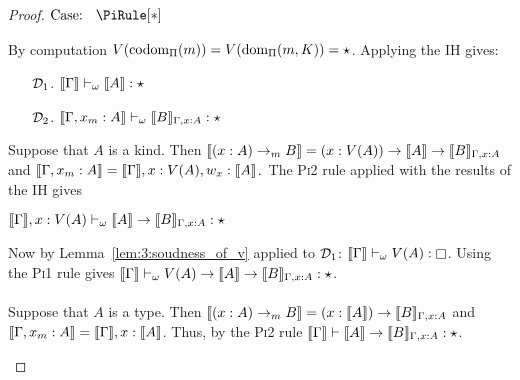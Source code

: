 \begin{proof}
    $\text{Case: }\begin{array}{c} \PiRule[*] \end{array}$
    \begin{proofcase}
        By computation $V(\textnormal{codom}_\Pi(m)) = V(\textnormal{dom}_\Pi(m, K)) = \star$.
        Applying the IH gives:
        \begin{enumerate}
            \item[$\mathcal{D}_{1}$.] $\llbracket \Gamma \rrbracket \vdash_\omega \llbracket A \rrbracket : \star$
            \item[$\mathcal{D}_{2}$.] $\llbracket \Gamma, x_m : A \rrbracket \vdash_\omega \llbracket B \rrbracket_{\Gamma, x:A} : \star$ 
        \end{enumerate}
        Suppose that $A$ is a kind.
        Then $\llbracket (x : A) \to_m B \rrbracket = (x : V(A)) \to \llbracket A \rrbracket \to \llbracket B \rrbracket_{\Gamma,x:A}$ and $\llbracket \Gamma, x_m : A \rrbracket = \llbracket \Gamma \rrbracket, x : V(A), w_x : \llbracket A \rrbracket$.\
        The \textsc{Pi2} rule applied with the results of the IH gives
            \begin{tightcenter} $\llbracket \Gamma \rrbracket, x : V(A) \vdash_\omega \llbracket A \rrbracket \to \llbracket B \rrbracket_{\Gamma, x : A} : \star$ \end{tightcenter}
        Now by Lemma~\ref{lem:3:soudness_of_v} applied to $\mathcal{D}_{1}$: $\sema{\Gamma} \vdash_\omega V(A) : \kind$.
        Using the \textsc{Pi1} rule gives $\llbracket \Gamma \rrbracket \vdash_\omega V(A) \to \llbracket A \rrbracket \to \llbracket B \rrbracket_{\Gamma, x : A} : \star$.
        \\ \\
        Suppose that $A$ is a type.
        Then $\llbracket (x : A) \to_m B \rrbracket = (x : \llbracket A \rrbracket) \to \llbracket B \rrbracket_{\Gamma,x:A}$ and $\llbracket \Gamma, x_m : A \rrbracket = \llbracket \Gamma \rrbracket, x : \llbracket A \rrbracket$.
        Thus, by the \textsc{Pi2} rule $\llbracket \Gamma \rrbracket \vdash \llbracket A \rrbracket \to \llbracket B \rrbracket_{\Gamma,x:A} : \star$.
    \end{proofcase}


\end{proof}
